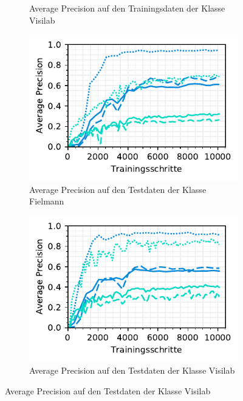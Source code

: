 \begin{figure}[h!]
\begin{subfigure}[b]{0.5\linewidth}
    \caption{Average Precision auf den Trainingsdaten der Klasse Visilab} 
    \label{fig:specific-ie:visilab:ap_train}
    \vspace{2ex}
  \end{subfigure}
  \begin{subfigure}[b]{0.5\linewidth}
    \captionsetup{width=.9\linewidth}
    \centering
    \includegraphics[scale=1]{graphics/matplot/img-detection__fielmann__ap.pdf}
    \caption{Average Precision auf den Testdaten der Klasse Fielmann} 
    \label{fig:specific-ie:fielmann:ap_val}
    \vspace{2ex}
  \end{subfigure}%
  \begin{subfigure}[b]{0.5\linewidth}
    \captionsetup{width=.9\linewidth}
    \centering
    \includegraphics[scale=1]{graphics/matplot/img-detection__visilab__ap.pdf}
    \caption{Average Precision auf den Testdaten der Klasse Visilab} 
    \label{fig:specific-ie:visilab:ap_val}
    \vspace{2ex}
  \end{subfigure}
\end{figure}

